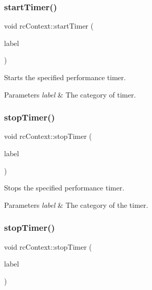 \subsubsection{\texorpdfstring{start\+Timer()}{startTimer()}\hspace{0.1cm}{\footnotesize\ttfamily [2/2]}}
{\footnotesize\ttfamily void rc\+Context\+::start\+Timer (\begin{DoxyParamCaption}\item[{const rc\+Timer\+Label}]{label }\end{DoxyParamCaption})\hspace{0.3cm}{\ttfamily [inline]}}

Starts the specified performance timer. 
\begin{DoxyParams}{Parameters}
{\em label} & The category of timer. \\
\hline
\end{DoxyParams}
\mbox{\label{classrcContext_a3f7042723b8d99d486575eb3d592af25}} 
\subsubsection{\texorpdfstring{stop\+Timer()}{stopTimer()}\hspace{0.1cm}{\footnotesize\ttfamily [1/2]}}
{\footnotesize\ttfamily void rc\+Context\+::stop\+Timer (\begin{DoxyParamCaption}\item[{const rc\+Timer\+Label}]{label }\end{DoxyParamCaption})\hspace{0.3cm}{\ttfamily [inline]}}

Stops the specified performance timer. 
\begin{DoxyParams}{Parameters}
{\em label} & The category of the timer. \\
\hline
\end{DoxyParams}
\mbox{\label{classrcContext_a3f7042723b8d99d486575eb3d592af25}} 
\subsubsection{\texorpdfstring{stop\+Timer()}{stopTimer()}\hspace{0.1cm}{\footnotesize\ttfamily [2/2]}}
{\footnotesize\ttfamily void rc\+Context\+::stop\+Timer (\begin{DoxyParamCaption}\item[{const rc\+Timer\+Label}]{label }\end{DoxyParamCaption})\hspace{0.3cm}{\ttfamily [inline]}}

